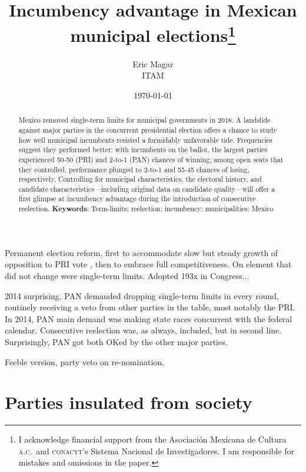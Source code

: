 \documentclass[letter,12pt]{article}
\begin{document}
\title{Incumbency advantage in Mexican municipal elections\thanks{I acknowledge financial support from the Asociaci\'on Mexicana de Cultura \textsc{a.c.}\ and \textsc{conacyt}'s Sistema Nacional de Investigadores. I am responsible for mistakes and omissions in the paper.}}
\author{Eric Magar \\ ITAM}
\date{\today}
\maketitle

\begin{abstract}
  \noindent Mexico removed single-term limits for municipal governments in 2018. A landslide against major parties in the concurrent presidential election offers a chance to study how well municipal incumbents resisted a formidably unfavorable tide. Frequencies suggest they performed better: with incumbents on the ballot, the largest parties experienced 50-50 (PRI) and 2-to-1 (PAN) chances of winning; among open seats that they controlled, performance plunged to 2-to-1 and 55-45 chances of losing, respectively. Controlling for municipal characteristics, the electoral history, and candidate characteristics---including original data on candidate quality---will offer a first glimpse at incumbency advantage during the introduction of consecutive reelection.
  \newline \newline
\textbf{Keywords}: Term-limits; reelection; incumbency; municipalities; Mexico
\end{abstract}

Permanent election reform, first to accommodate slow but steady growth of opposition to PRI vote \citep{molinar.inDrakeSilva.1986}, then to embrace full competitiveness. On element that did not change were single-term limits. Adopted 193x in Congress...

2014 surprising. PAN demanded dropping single-term limits in every round, routinely receiving a veto from other parties in the table, most notably the PRI. In 2014, PAN main demand was making state races concurrent with the federal calendar. Consecutive reelection was, as always, included, but in second line. Surprisingly, PAN got both OKed by the other major parties. 

Feeble version, party veto on re-nomination. 

\section{Parties insulated from society}
\end{document}
